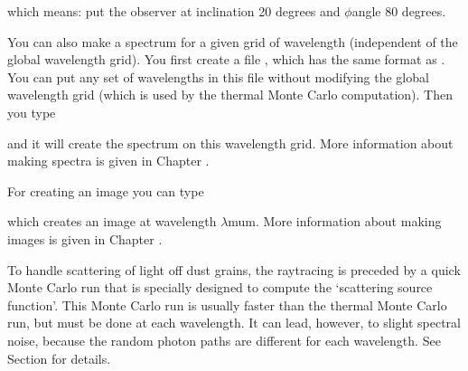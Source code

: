 \documentclass[letterpaper,10pt,english]{sphinxmanual}
\begin{document}
which means: put the observer at inclination 20 degrees and \(\phi\)\sphinxhyphen{}angle
80 degrees.

You can also make a spectrum for a given grid of wavelength (independent of the
global wavelength grid). You first create a file
, which has the same format as
. You can put any set of wavelengths in this file
without modifying the global wavelength grid (which is used by the thermal Monte
Carlo computation). Then you type

\begin{sphinxVerbatim}[commandchars=\\\{\}]
  
\end{sphinxVerbatim}

and it will create the spectrum on this wavelength grid. More information about
making spectra is given in Chapter {\hyperref[\detokenize{imagesspectra:chap-images-spectra}]{}}.

For creating an image you can type

\begin{sphinxVerbatim}[commandchars=\\\{\}]
   
\end{sphinxVerbatim}

which creates an image at wavelength \(\lambda\)mu\textasciigrave{}m. More information
about making images is given in Chapter {\hyperref[\detokenize{imagesspectra:chap-images-spectra}]{}}.

 To handle scattering of light off dust grains, the ray\sphinxhyphen{}tracing
is preceded by a quick Monte Carlo run that is specially designed to compute the
‘scattering source function’. This Monte Carlo run is usually  faster
than the thermal Monte Carlo run, but must be done at each wavelength. It can
lead, however, to slight spectral noise, because the random photon paths are
different for each wavelength.  See Section {\hyperref[\detokenize{dustradtrans:sec-scattering}]{}} for details.
\end{document}
